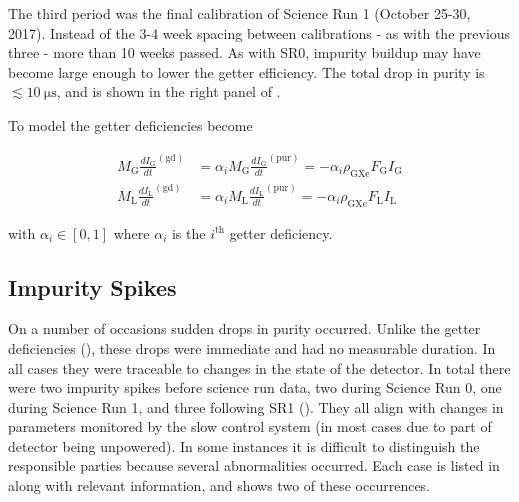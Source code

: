 The third period was the final  calibration of Science Run 1 (October 25-30, 2017).  Instead of the 3-4 week spacing between
calibrations - as with the previous three - more than 10 weeks passed.  As with SR0, impurity buildup may have become
large enough to lower the getter efficiency.  The total drop in purity is $\lesssim 10\ \mathrm{\mu s}$, and is shown in the right panel
of .

To model the getter deficiencies 
become

\vspace{-20pt}

\begin{subequations}
\begin{align}
M_{\mathrm{G}} \frac{dI_{\mathrm{G}}}{dt}^{(\mathrm{gd})} &= \alpha_i M_{\mathrm{G}} \frac{dI_{\mathrm{G}}}{dt}^{(\mathrm{pur})} =
-\alpha_i \rho_{\mathrm{GXe}} F_{\mathrm{G}} I_{\mathrm{G}}
\label{eq:electron_lifetime_model_detector_effects_getter_gxe}
\\
M_{\mathrm{L}} \frac{dI_{\mathrm{L}}}{dt}^{(\mathrm{gd})} &= \alpha_i M_{\mathrm{L}} \frac{dI_{\mathrm{L}}}{dt}^{(\mathrm{pur})} =
-\alpha_i \rho_{\mathrm{GXe}} F_{\mathrm{L}} I_{\mathrm{L}}
\label{eq:electron_lifetime_model_detector_effects_getter_lxe}
\end{align}
\end{subequations}

\noindent with $\alpha_i \in [0, 1]$ where $\alpha_i$ is the $i^{\mathrm{th}}$ getter deficiency.



\subsection{Impurity Spikes}
\label{subsec:electron_lifetime_model_detector_effects_spikes}
On a number of occasions sudden drops in purity occurred.  Unlike the getter deficiencies
(), these drops were immediate and
had no measurable duration.  In all cases they were traceable to changes in the state of the detector.  In total there were two impurity
spikes before science run data, two during Science Run 0, one during Science Run 1, and three following SR1
().  They all align with changes in parameters monitored by the slow control system (in most
cases due to part of detector being unpowered).  In some
instances it is difficult to distinguish the responsible parties because several abnormalities occurred.  Each case is listed in
 along with relevant information, and
 shows two of these occurrences.

